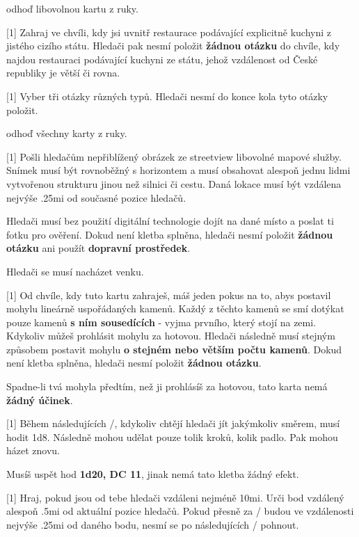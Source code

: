 \begin{cards}
	\cost odhoď libovolnou kartu z ruky.
	
	 Zahraj ve chvíli, kdy jsi uvnitř restaurace podávající explicitně kuchyni z jistého cizího státu. Hledači pak nesmí položit \textbf{žádnou otázku} do chvíle, kdy najdou restauraci podávající kuchyni ze státu, jehož vzdálenost od České republiky je větší či rovna.
	
	 Vyber tři otázky různých typů. Hledači nesmí do konce kola tyto otázky položit.
	
	\cost odhoď všechny karty z ruky.
	
	 Pošli hledačům nepřiblížený obrázek ze streetview libovolné mapové služby. Snímek musí být rovnoběžný s horizontem a musí obsahovat alespoň jednu lidmi vytvořenou strukturu jinou než silnici či cestu. Daná lokace musí být vzdálena nejvýše \dist.25mi od současné pozice hledačů.
	
	Hledači musí bez použití digitální technologie dojít na dané místo a poslat ti fotku pro ověření. Dokud není kletba splněna, hledači nesmí položit \textbf{žádnou otázku} ani použít \textbf{dopravní prostředek}.
	
	\cost Hledači se musí nacházet venku.
	
	 Od chvíle, kdy tuto kartu zahraješ, máš jeden pokus na to, abys postavil mohylu lineárně uspořádaných kamenů. Každý z těchto kamenů se smí dotýkat pouze kamenů \textbf{s ním sousedících} - vyjma prvního, který stojí na zemi. Kdykoliv můžeš prohlásit mohylu za hotovou. Hledači následně musí stejným způsobem postavit mohylu \textbf{o stejném nebo větším počtu kamenů}. Dokud není kletba splněna, hledači nesmí položit \textbf{žádnou otázku}.
	
	Spadne-li tvá mohyla předtím, než ji prohlásíš za hotovou, tato karta nemá \textbf{žádný účinek}.
	
	 Během následujících \timecursegambler/, kdykoliv chtějí hledači jít jakýmkoliv směrem, musí hodit 1d8. Následně mohou udělat pouze tolik kroků, kolik padlo. Pak mohou házet znovu.
	
	\cost Musíš uspět hod \textbf{1d20, DC 11}, jinak nemá tato kletba žádný efekt.
	
	 Hraj, pokud jsou od tebe hledači vzdáleni nejméně \dist10mi. Urči bod vzdálený alespoň \dist.5mi od aktuální pozice hledačů. Pokud přesně za \timecursedotcountdown/ budou ve vzdálenosti nejvýše \dist.25mi od daného bodu, nesmí se po následujících \timecursedotfreeze/ pohnout.
	

\end{cards}
